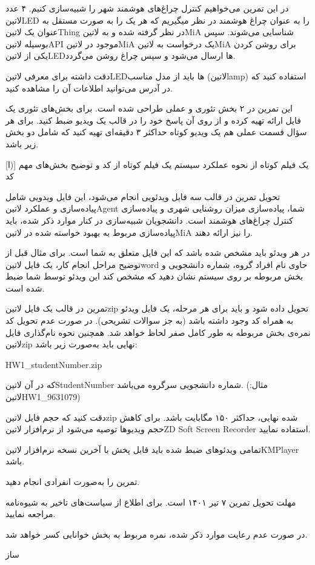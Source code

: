 \documentclass[]{assignment}
\begin{document}
در این تمرین می‌خواهیم کنترل چراغ‌های هوشمند شهر را شبیه‌سازی کنیم. ۴ عدد ‌لاتین{LED} را به عنوان چراغ هوشمند در نظر میگیریم
که هر یک را به صورت مستقل به عنوان یک ‌لاتین{Thing} در نظر گرفته شده و به ‌لاتین{MiA} شناسایی می‌شوند.
سپس بوسیله ‌لاتین{API} موجود در ‌لاتین{MiA} یک درخواست به ‌لاتین{MiA} برای روشن کردن یکی از ‌لاتین{LED}ها ارسال می‌شود
و سپس چراغ روشن می‌گردد.

دقت داشته برای معرفی ‌لاتین{LED}ها باید از مدل مناسب (‌لاتین{lamp}) استفاده کنید
که در  آدرس می‌توانید اطلاعات آن را مشاهده کنید.



 این تمرین در ۲ بخش تئوری و عملی طراحی شده است.
برای بخش‌های تئوری یک فایل ارائه تهیه کرده و از روی آن پاسخ خود را در قالب یک ویدیو ضبط کنید.
برای هر سؤال قسمت عملی هم یک ویدیو کوتاه حداکثر ۳ دقیقه‌ای تهیه کنید که شامل دو بخش زیر باشد.

[ا)]
 یک فیلم کوتاه از نحوه عملکرد سیستم
 یک فیلم کوتاه از کد و توضیح بخش‌های مهم کد

 تحویل تمرین در قالب سه فایل ویدئویی انجام می‌شود، این فایل ویدویی شامل پیاده‌سازی و عملکرد ‌لاتین{Agent} شما، پیاده‌سازی میزان روشنایی شهری
و پیاده‌سازی کنترل چراغ‌های هوشمند است.
دانشجویان شبیه‌سازی در کنار موارد ذکر شده، باید پیاده‌سازی مربوط به بهبود خواسته شده در ‌لاتین{MiA} را نیز ارائه دهند.

 در هر ویدئو باید مشخص شده باشد که این فایل متعلق به شما است. برای مثال قبل از توضیح مراحل انجام کار، یک فایل ‌لاتین{word}
حاوی نام افراد گروه، شماره دانشجویی و بخش مربوطه بر روی سیستم نشان دهید که مشخص کند این ویدئو توسط شما ضبط شده است.

 تمرین در قالب یک فایل ‌لاتین{zip} تحویل داده شود و باید برای هر مرحله، یک فایل ویدئو به همراه کد وجود داشته باشد (به جز سوالات تشریحی).
در صورت عدم تحویل کد نمره‌ی بخش مربوطه به طور کامل صفر لحاظ خواهد شد. همچنین نحوه نام‌گذاری فایل ‌لاتین{zip} نهایی باید به‌صورت زیر باشد:

HW1\_studentNumber.zip

که در آن ‌لاتین{StudentNumber} شماره دانشجویی سرگروه می‌باشد. (مثال: ‌لاتین{HW1\_9631079})

 دقت کنید که حجم فایل ‌لاتین{zip} شده نهایی، حداکثر ۱۵۰ مگابایت باشد.
برای کاهش حجم ویدیو‌ها توصیه می‌شود از نرم‌افزار ‌لاتین{ZD Soft Screen Recorder} استفاده نمایید.

 تمامی ویدئوهای ضبط شده باید قابل پخش با آخرین نسخه نرم‌افزار ‌لاتین{KMPlayer} باشد.

 تمرین را به‌صورت انفرادی انجام دهید.

 مهلت تحویل تمرین ۷ تیر ۱۴۰۱ است. برای اطلاع از سیاست‌های تاخیر به شیوه‌نامه مراجعه نمایید.

 در صورت عدم رعایت موارد ذکر شده، نمره مربوط به بخش خوانایی کسر خواهد شد.


‌ساز
\end{document}
